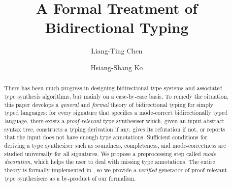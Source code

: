 \documentclass[runningheads,orivec,envcountsect,envcountsame]{llncs}
\author{Liang-Ting Chen\orcidID{0000-0002-3250-1331} \and Hsiang-Shang Ko\orcidID{0000-0002-2439-1048}}
\institute{Institute of Information Science, Academia Sinica, Taipei, Taiwan}
\title{A Formal Treatment of Bidirectional Typing}
\numberwithin{table}{section}
\begin{document}
\maketitle

\begin{abstract}
There has been much progress in designing bidirectional type systems and associated type synthesis algorithms, but mainly on a case-by-case basis.
To remedy the situation, this paper develops a \emph{general} and \emph{formal} theory of bidirectional typing for simply typed languages: for every signature that specifies a mode-correct bidirectionally typed language, there exists a \emph{proof-relevant} type synthesiser which, given an input abstract syntax tree, constructs a typing derivation if any, gives its refutation if not, or reports that the input does not have enough type annotations.
Sufficient conditions for deriving a type synthesiser such as soundness, completeness, and mode-correctness are studied universally for all signatures.
We propose a preprocessing step called \emph{mode decoration}, which helps the user to deal with missing type annotations.
The entire theory is formally implemented in \Agda, so we provide a \emph{verified} generator of proof-relevant type synthesisers as a by-product of our formalism.
\end{abstract}


\newif\ifarxiv 












\ifarxiv

\appendix



\fi
\end{document}
